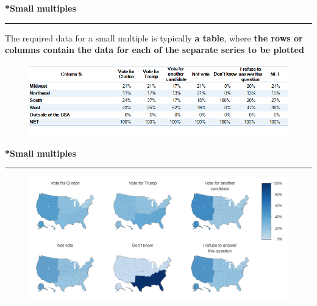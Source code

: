 \documentclass[pdf]{beamer}
\begin{document}
\begin{frame}
{\textbf{*Small multiples}}{\textcolor{red}{\rule{12cm}{1.2pt}}}

The required data for a small multiple is typically \textbf{a table}, where \textbf{the rows or columns contain the data for each of the separate series to be plotted}

\begin{figure}
\includegraphics[scale=0.5]{24_SmallMultiple_Data.png}
\end{figure}

\end{frame}



\begin{frame}
{\textbf{*Small multiples}}{\textcolor{red}{\rule{12cm}{1.2pt}}}

\begin{figure}
\includegraphics[scale=0.45]{24_SmallMultiple.png}
\end{figure}

\end{frame}



\end{document}
